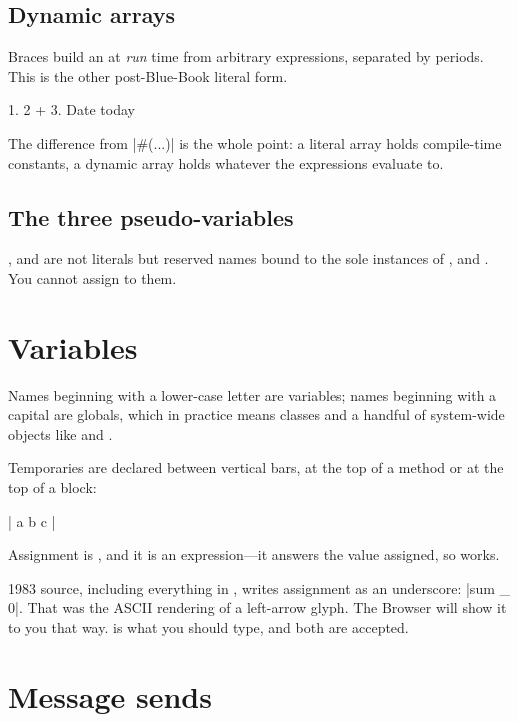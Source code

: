 \subsection{Dynamic arrays}

Braces build an  at \emph{run} time from arbitrary expressions,
separated by periods. This is the other post-Blue-Book literal form.

\begin{st}
{ 1. 2 + 3. Date today }
\end{st}

The difference from \ct|#(...)| is the whole point: a literal array holds
compile-time constants, a dynamic array holds whatever the expressions
evaluate to.

\subsection{The three pseudo-variables}

,  and  are not literals but reserved names bound
to the sole instances of ,  and . You
cannot assign to them.

\section{Variables}

Names beginning with a lower-case letter are variables; names beginning with a
capital are globals, which in practice means classes and a handful of
system-wide objects like  and .

Temporaries are declared between vertical bars, at the top of a method or at
the top of a block:

\begin{st}
| a b c |
\end{st}

Assignment is \ct{:=}, and it is an expression---it answers the value
assigned, so  works.

\begin{stnote}
1983 source, including everything in , writes assignment as an
underscore: \ct|sum _ 0|. That was the ASCII rendering of a left-arrow glyph.
The Browser will show it to you that way. \ct{:=} is what you should type, and
both are accepted.
\end{stnote}

\section{Message sends}

